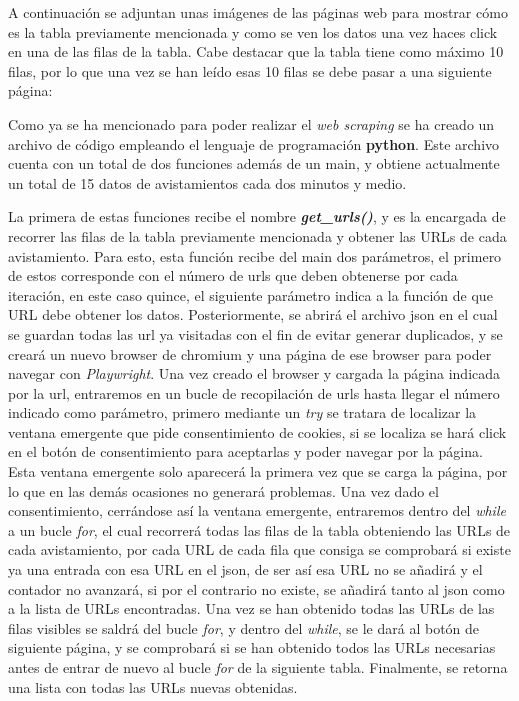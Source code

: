 A continuación se adjuntan unas imágenes de las páginas web para mostrar cómo es la tabla previamente mencionada y como se ven los datos una vez haces click en una de las filas de la tabla. Cabe destacar que la tabla tiene como máximo 10 filas, por lo que una vez se han leído esas 10 filas se debe pasar a una siguiente página:



Como ya se ha mencionado para poder realizar el \textit{web scraping} se ha creado un archivo de código empleando el lenguaje de programación \textbf{python}. Este archivo cuenta con un total de dos funciones además de un main, y obtiene actualmente un total de 15 datos de avistamientos cada dos minutos y medio.

La primera de estas funciones recibe el nombre \textbf{\textit{get\_urls()}}, y es la encargada de recorrer las filas de la tabla previamente mencionada y obtener las URLs de cada avistamiento. Para esto, esta función recibe del main dos parámetros, el primero de estos corresponde con el número de urls que deben obtenerse por cada iteración, en este caso quince, el siguiente parámetro indica a la función de que URL debe obtener los datos. Posteriormente, se abrirá el archivo json en el cual se guardan todas las url ya visitadas con el fin de evitar generar duplicados, y se creará un nuevo browser de chromium y una página de ese browser para poder navegar con \textit{Playwright}. Una vez creado el browser y cargada la página indicada por la url, entraremos en un bucle de recopilación de urls hasta llegar el número indicado como parámetro, primero mediante un \textit{try} se tratara de localizar la ventana emergente que pide consentimiento de cookies, si se localiza se hará click en el botón de consentimiento para aceptarlas y poder navegar por la página. Esta ventana emergente solo aparecerá la primera vez que se carga la página, por lo que en las demás ocasiones no generará problemas. Una vez dado el consentimiento, cerrándose así la ventana emergente, entraremos dentro del \textit{while} a un bucle \textit{for}, el cual recorrerá todas las filas de la tabla obteniendo las URLs de cada avistamiento, por cada URL de cada fila que consiga se comprobará si existe ya una entrada con esa URL en el json, de ser así esa URL no se añadirá y el contador no avanzará, si por el contrario no existe, se añadirá tanto al json como a la lista de URLs encontradas. Una vez se han obtenido todas las URLs de las filas visibles se saldrá del bucle \textit{for}, y dentro del \textit{while}, se le dará al botón de siguiente página, y se comprobará si se han obtenido todos las URLs necesarias antes de entrar de nuevo al bucle \textit{for} de la siguiente tabla. Finalmente, se retorna una lista con todas las URLs nuevas obtenidas.

